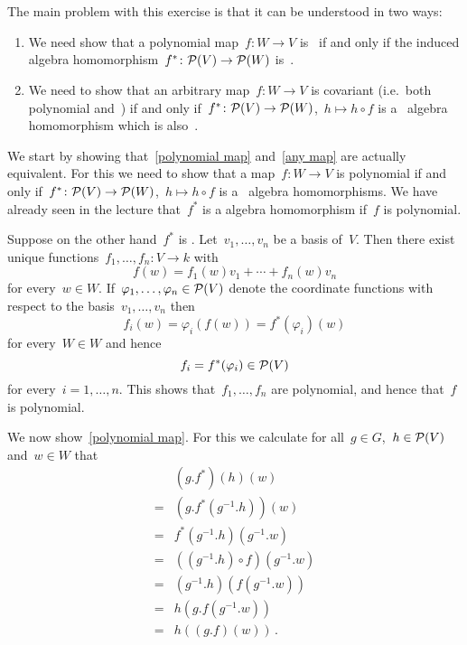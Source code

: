 \section{}





\subsection{}

The main problem with this exercise is that it can be understood in two ways:
\begin{enumerate}
  \item
    \label{polynomial map}
    We need show that a polynomial map~$f \colon W \to V$ is~ if and only if the induced algebra homomorphism~$f^* \colon \mathcal{P}(V) \to \mathcal{P}(W)$ is~.
  \item
    \label{any map}
    We need to show that an arbitrary map~$f \colon W \to V$ is covariant (i.e.\ both polynomial and~) if and only if~$f^* \colon \mathcal{P}(V) \to \mathcal{P}(W)$,~$h \mapsto h \circ f$ is a~{\welldef} algebra homomorphism which is also~.
\end{enumerate}


We start by showing that~\ref*{polynomial map} and~\ref*{any map} are actually equivalent.
For this we need to show that a map~$f \colon W \to V$ is polynomial if and only if~$f^* \colon \mathcal{P}(V) \to \mathcal{P}(W)$,~$h \mapsto h \circ f$ is a~{\welldef} algebra homomorphisms.
We have already seen in the lecture that~$f^*$ is a {\welldef} algebra homomorphism if~$f$ is polynomial.

Suppose on the other hand~$f^*$ is {\welldef}.
Let~$v_1, \dotsc, v_n$ be a basis of~$V$.
Then there exist unique functions~$f_1, \dotsc, f_n \colon V \to k$ with
\[
    f(w)
  = f_1(w) v_1 + \dotsb + f_n(w) v_n
\]
for every~$w \in W$.
If~$\varphi_1, \dotsc, \varphi_n \in \mathcal{P}(V)$ denote the coordinate functions with respect to the basis~$v_1, \dotsc, v_n$ then
\[
    f_i(w)
  = \varphi_i( f(w) )
  = f^*(\varphi_i)(w)
\]
for every~$W \in W$ and hence
\[
      f_i
  =   f^*(\varphi_i)
  \in \mathcal{P}(V)
\]
for every~$i = 1, \dotsc, n$.
This shows that~$f_1, \dotsc, f_n$ are polynomial, and hence that~$f$ is polynomial.

We now show~\ref*{polynomial map}.
For this we calculate for all~$g \in G$,~$h \in \mathcal{P}(V)$ and~$w \in W$ that
\begin{align*}
   {}&  (g.f^*)(h)(w) \\
  ={}&  (g.f^*(g^{-1}.h))(w)  \\
  ={}&  f^*(g^{-1}.h)(g^{-1}.w) \\
  ={}&  ((g^{-1}.h) \circ f)(g^{-1}.w)  \\
  ={}&  (g^{-1}.h)( f( g^{-1}.w ) ) \\
  ={}&  h( g.f( g^{-1}.w ) )  \\
  ={}&  h( (g.f)(w) )\,.
\end{align*}

